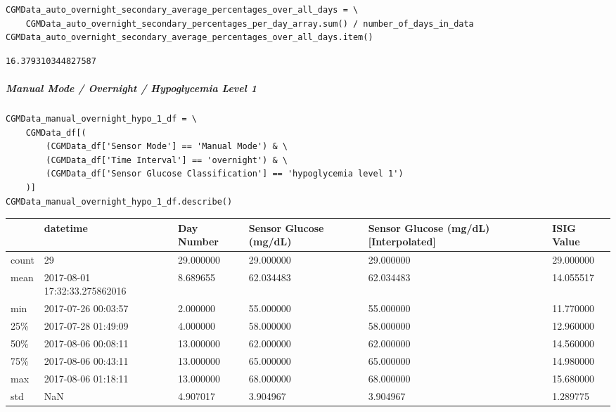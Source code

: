 \begin{verbatim}
CGMData_auto_overnight_secondary_average_percentages_over_all_days = \
    CGMData_auto_overnight_secondary_percentages_per_day_array.sum() / number_of_days_in_data
CGMData_auto_overnight_secondary_average_percentages_over_all_days.item()
\end{verbatim}

\begin{verbatim}
16.379310344827587
\end{verbatim}

\subparagraph{Manual Mode / Overnight / Hypoglycemia Level 1}

\begin{verbatim}
CGMData_manual_overnight_hypo_1_df = \
    CGMData_df[(
        (CGMData_df['Sensor Mode'] == 'Manual Mode') & \
        (CGMData_df['Time Interval'] == 'overnight') & \
        (CGMData_df['Sensor Glucose Classification'] == 'hypoglycemia level 1')
    )]
CGMData_manual_overnight_hypo_1_df.describe()
\end{verbatim}

\bigskip\noindent
\begin{tabular}{p{}p{}p{}p{}p{}p{}}
\toprule
 & datetime & Day Number & Sensor Glucose (mg/dL) & Sensor Glucose (mg/dL) [Interpolated] & ISIG Value \\
\hline
count & 29 & 29.000000 & 29.000000 & 29.000000 & 29.000000 \\
\hline
mean & 2017-08-01 17:32:33.275862016 & 8.689655 & 62.034483 & 62.034483 & 14.055517 \\
\hline
min & 2017-07-26 00:03:57 & 2.000000 & 55.000000 & 55.000000 & 11.770000 \\
\hline
25\% & 2017-07-28 01:49:09 & 4.000000 & 58.000000 & 58.000000 & 12.960000 \\
\hline
50\% & 2017-08-06 00:08:11 & 13.000000 & 62.000000 & 62.000000 & 14.560000 \\
\hline
75\% & 2017-08-06 00:43:11 & 13.000000 & 65.000000 & 65.000000 & 14.980000 \\
\hline
max & 2017-08-06 01:18:11 & 13.000000 & 68.000000 & 68.000000 & 15.680000 \\
\hline
std & NaN & 4.907017 & 3.904967 & 3.904967 & 1.289775 \\
\hline
\bottomrule
\end{tabular}

